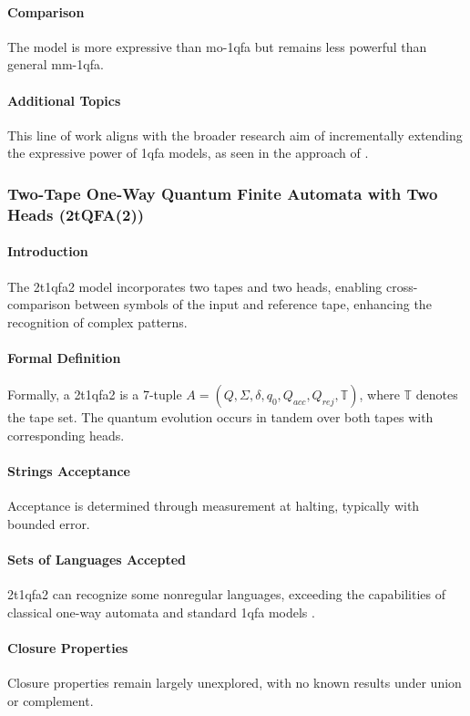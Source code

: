 \paragraph{Comparison}
The model is more expressive than \gls{mo-1qfa} but remains less powerful than general \gls{mm-1qfa}.

\paragraph{Additional Topics}
This line of work aligns with the broader research aim of incrementally extending the expressive power of \gls{1qfa} models, as seen in the approach of \cite{ciamarra2001quantum}.

\subsubsection{Two-Tape One-Way Quantum Finite Automata with Two Heads (2tQFA(2))}
\paragraph{Introduction}
The \gls{2t1qfa2} model incorporates two tapes and two heads, enabling cross-comparison between symbols of the input and reference tape, enhancing the recognition of complex patterns.

\paragraph{Formal Definition}
Formally, a \gls{2t1qfa2} is a 7-tuple \( A = (Q, \Sigma, \delta, q_0, Q_{acc}, Q_{rej}, \mathbb{T}) \), where \( \mathbb{T} \) denotes the tape set. The quantum evolution occurs in tandem over both tapes with corresponding heads.

\paragraph{Strings Acceptance}
Acceptance is determined through measurement at halting, typically with bounded error.

\paragraph{Sets of Languages Accepted}
\gls{2t1qfa2} can recognize some nonregular languages, exceeding the capabilities of classical one-way automata and standard \gls{1qfa} models \cite{ganguly20162}.

\paragraph{Closure Properties}
Closure properties remain largely unexplored, with no known results under union or complement.

